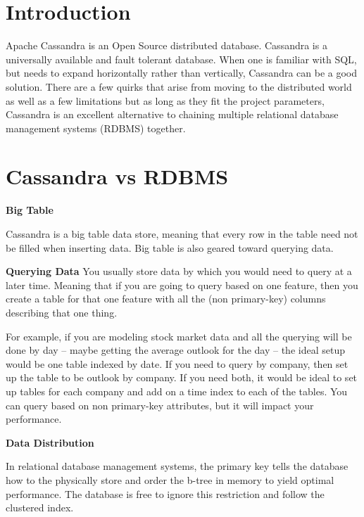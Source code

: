 \documentclass[9pt,twocolumn,twoside]{idsi}
\begin{document}
\makecoverpage

\maketitle

\section{Introduction}

Apache Cassandra is an Open Source distributed database. Cassandra is a universally available and fault tolerant database. When one is familiar with SQL, but needs to expand horizontally rather than vertically, Cassandra can be a good solution. There are a few quirks that arise from moving to the distributed world as well as a few limitations but as long as they fit the project parameters, Cassandra is an excellent alternative to chaining multiple relational database management systems (RDBMS) together.

\section{Cassandra vs RDBMS}

\textbf{Big Table}

Cassandra is a big table data store, meaning that every row in the table need not be filled when inserting data. Big table is also geared toward querying data.

\textbf{Querying Data}
You usually store data by which you would need to query at a later time. Meaning that if you are going to query based on one feature, then you create a table for that one feature with all the (non primary-key) columns describing that one thing.

For example, if you are modeling stock market data and all the querying will be done by day -- maybe getting the average outlook for the day -- the ideal setup would be one table indexed by date. If you need to query by company, then set up the table to be outlook by company. If you need both, it would be ideal to set up tables for each company and add on a time index to each of the tables. You can query based on non primary-key attributes, but it will impact your performance.

\textbf{Data Distribution}

In relational database management systems, the primary key tells the database how to the physically store and order the b-tree in memory to yield optimal performance. The database is free to ignore this restriction and follow the clustered index.
\end{document}
